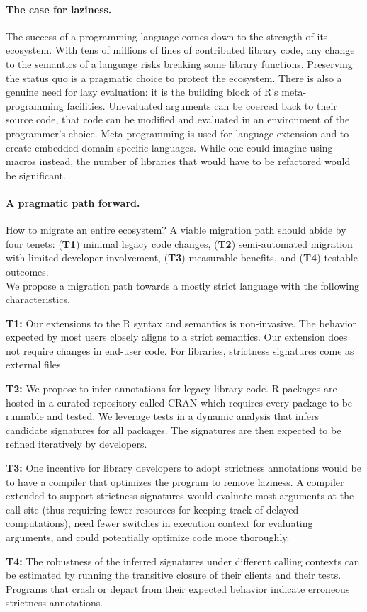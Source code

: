 \documentclass[review,nonacm,screen,acmsmall,anonymous=true]{acmart}
\begin{document}
\paragraph{The case for laziness.} The success of a programming language
comes down to the strength of its ecosystem. With tens of millions of lines of
contributed library code, any change to the semantics of a language risks
breaking some library functions. Preserving the status quo is a pragmatic choice
to protect the ecosystem. There is also a genuine need for lazy evaluation: it is
the building block of R's meta-programming facilities. Unevaluated arguments can
be coerced back to their source code, that code can be modified and evaluated in
an environment of the programmer's choice. Meta-programming is used for language
extension and to create embedded domain specific languages. While one could
imagine using macros instead, the number of libraries that would have to be
refactored would be significant.

\paragraph{A pragmatic path forward.} How to  migrate an entire ecosystem?
A viable migration path should abide by four tenets: ({\bf T1}) minimal legacy
code changes, ({\bf T2}) semi-automated migration with limited developer
involvement, ({\bf T3}) measurable benefits, and ({\bf T4}) testable outcomes.\\
We propose a migration path towards a mostly strict language
with the following characteristics.
\vspace{1mm}
\begin{compactitem}[---]
\item {\bf T1:} Our extensions to the R syntax and semantics is non-invasive.
  The behavior expected by most users closely aligns to a strict semantics. Our
  extension does not require changes in end-user code. For libraries, strictness
  signatures come as external files.
\item {\bf T2:} We propose to infer annotations for legacy library code. R
  packages are hosted in a curated repository called CRAN which requires every
  package to be runnable and tested. We leverage tests in a dynamic analysis
  that infers candidate signatures for all packages. The signatures are then
  expected to be refined iteratively by developers.
\item {\bf T3:} One incentive for library developers to adopt strictness
  annotations would be to have a compiler that optimizes the program to remove
  laziness. A compiler extended to support strictness signatures would evaluate
  most arguments at the call-site (thus requiring fewer resources for keeping
  track of delayed computations), need fewer switches in execution context for
  evaluating arguments, and could potentially optimize code more thoroughly.
\item {\bf T4:} The robustness of the inferred signatures under different
  calling contexts can be estimated by running the transitive closure
  of their clients and their tests. Programs that crash or depart from their
  expected behavior indicate erroneous strictness annotations.
\end{compactitem}
\end{document}
